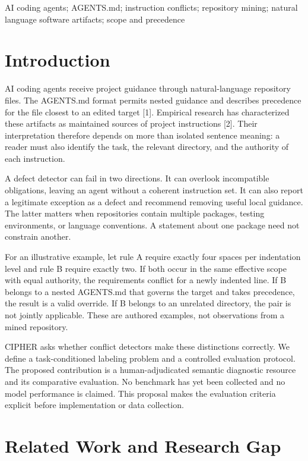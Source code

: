 \documentclass[10pt,conference]{IEEEtran}
\begin{document}
\begin{IEEEkeywords}AI coding agents; AGENTS.md; instruction conflicts; repository mining; natural language software artifacts; scope and precedence\end{IEEEkeywords}

\section{Introduction}

AI coding agents receive project guidance through natural-language repository files. The AGENTS.md format permits nested guidance and describes precedence for the file closest to an edited target [1]. Empirical research has characterized these artifacts as maintained sources of project instructions [2]. Their interpretation therefore depends on more than isolated sentence meaning: a reader must also identify the task, the relevant directory, and the authority of each instruction.


A defect detector can fail in two directions. It can overlook incompatible obligations, leaving an agent without a coherent instruction set. It can also report a legitimate exception as a defect and recommend removing useful local guidance. The latter matters when repositories contain multiple packages, testing environments, or language conventions. A statement about one package need not constrain another.


For an illustrative example, let rule A require exactly four spaces per indentation level and rule B require exactly two. If both occur in the same effective scope with equal authority, the requirements conflict for a newly indented line. If B belongs to a nested AGENTS.md that governs the target and takes precedence, the result is a valid override. If B belongs to an unrelated directory, the pair is not jointly applicable. These are authored examples, not observations from a mined repository.


CIPHER asks whether conflict detectors make these distinctions correctly. We define a task-conditioned labeling problem and a controlled evaluation protocol. The proposed contribution is a human-adjudicated semantic diagnostic resource and its comparative evaluation. No benchmark has yet been collected and no model performance is claimed. This proposal makes the evaluation criteria explicit before implementation or data collection.


\section{Related Work and Research Gap}
\end{document}

